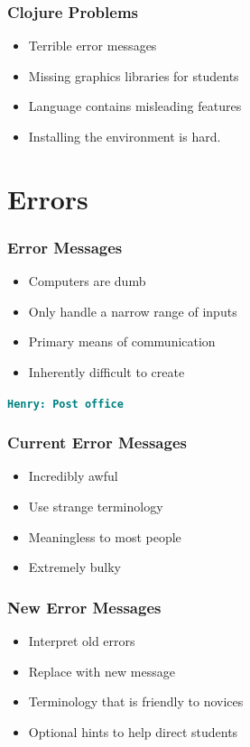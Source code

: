 \documentclass{beamer}
\newcommand{\comment}[1]{{\bf \tt  {#1}}}
\newcommand{\hfcomment}[1]{\textcolor{Teal}{\comment{Henry: {#1}}}}
\begin{document}
\begin{frame}
	\frametitle{Clojure Problems}
	\begin{itemize}
		\item Terrible error messages
		\item Missing graphics libraries for students
		\item Language contains misleading features
		\item Installing the environment is hard.
	\end{itemize}
\end{frame}



\section{Errors}

\begin{frame}
	\frametitle{Error Messages}
	\begin{itemize}
		\item Computers are dumb
		\item Only handle a narrow range of inputs
		\item Primary means of communication
		\item Inherently difficult to create
	\end{itemize}
	\hfcomment{Post office}
\end{frame}

\begin{frame}
	\frametitle{Current Error Messages}
	\begin{itemize}
		\item Incredibly awful
		\item Use strange terminology
		\item Meaningless to most people
		\item Extremely bulky
	\end{itemize}
\end{frame}

\begin{frame}
	\frametitle{New Error Messages}
	\begin{itemize}
		\item Interpret old errors
		\item Replace with new message
		\item Terminology that is friendly to novices
		\item Optional hints to help direct students
	\end{itemize}
\end{frame}
\end{document}
